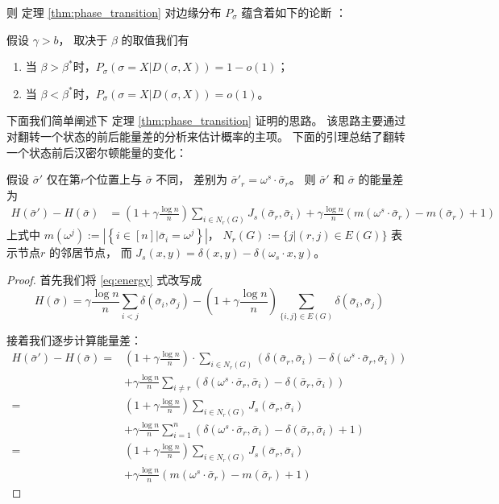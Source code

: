 则 定理 \ref{thm:phase_transition} 对边缘分布 $P_{\sigma}$ 蕴含着如下的论断
：
\begin{corollary}\label{cor:phase4}
假设 $\gamma > b$， 取决于 $\beta$ 的取值我们有
\begin{enumerate}
	\item 当 $\beta > \beta^*$时，$P_{\sigma}(\sigma = X | D(\sigma, X))  = 1-o(1)$；
	\item 当 $\beta < \beta^*$时，$P_{\sigma}(\sigma = X | D(\sigma, X))  = o(1)$。
\end{enumerate}
\end{corollary}

下面我们简单阐述下 定理 \ref{thm:phase_transition} 证明的思路。
该思路主要通过对翻转一个状态的前后能量差的分析来估计概率的主项。
下面的引理总结了翻转一个状态前后汉密尔顿能量的变化：
\begin{lemma}\label{lem:lemmaDiff}
	假设 $\bar{\sigma}'$ 仅在第$r$个位置上与 $\bar{\sigma}$ 不同，
	差别为 $\bar{\sigma}'_r = \omega^s \cdot \bar{\sigma}_r$。
	则 $\bar{\sigma}'$ 和 $\bar{\sigma}$ 的能量差为
\begin{align}
	H(\bar{\sigma}') - H(\bar{\sigma}) &= \left(1+\gamma \frac{\log n}{n} \right)
	\sum_{i \in N_r(G)} J_s(\bar{\sigma}_r, \bar{\sigma}_i)
	+ \gamma \frac{\log n}{n} (m(\omega^s \cdot \bar{\sigma}_r)-m(\bar{\sigma}_r)+1) \label{eq:DeltaH}
	\end{align}
	上式中 $m(\omega^j) := \left|\left\{i \in [n] | \bar{\sigma}_i = \omega^j \right\} \right| $，
	$N_r(G):=\{j | (r, j) \in E(G) \}$ 表示节点$r$
	的邻居节点，
	而 $J_s(x, y) = \delta(x, y) - \delta(\omega_s \cdot x, y)$。
\end{lemma}
\begin{proof}
	首先我们将
  \eqref{eq:energy} 式改写成
	\begin{equation*}
	H(\bar{\sigma}) = \gamma \frac{\log n}{n} \sum_{i < j} \delta(\bar{\sigma}_i, \bar{\sigma}_j)
	- \left(1 + \gamma\frac{\log n}{n} \right)
	\sum_{ \{i, j\} \in E(G)} \delta(\bar{\sigma}_i, \bar{\sigma}_j)
	\end{equation*}
	
	接着我们逐步计算能量差：
  \begin{align*}
	H(\bar{\sigma}') - H(\bar{\sigma}) =& 
  \left(1 + \gamma\frac{\log n}{n}
  \right)
  \cdot \sum_{i \in N_r(G)} (\delta(\bar{\sigma}_r, \bar{\sigma}_i) -
	\delta(\omega^s \cdot \bar{\sigma}_r, \bar{\sigma}_i)) \\
	&+ \gamma \frac{\log n}{n}\sum_{i\neq r}
	( \delta(\omega^s \cdot \bar{\sigma}_r, \bar{\sigma}_i) -
	\delta( \bar{\sigma}_r, \bar{\sigma}_i) ) \\
	 =& \left(
     1 + \gamma\frac{\log n}{n}
     \right)
   \sum_{i \in N_r(G)} J_s(\bar{\sigma}_r, \bar{\sigma}_i) \\
	&+ \gamma \frac{\log n}{n}\sum_{i=1}^n
	( \delta(\omega^s \cdot \bar{\sigma}_r, \bar{\sigma}_i) -
	\delta( \bar{\sigma}_r, \bar{\sigma}_i) +1) \\
	=& \left(1+\gamma \frac{\log n}{n}
  \right)
  \sum_{i \in N_r(G)} J_s(\bar{\sigma}_r, \bar{\sigma}_i)\\
	&+ \gamma \frac{\log n}{n} (m(\omega^s \cdot \bar{\sigma}_r)-m(\bar{\sigma}_r)+1)
	\end{align*}
\end{proof}
